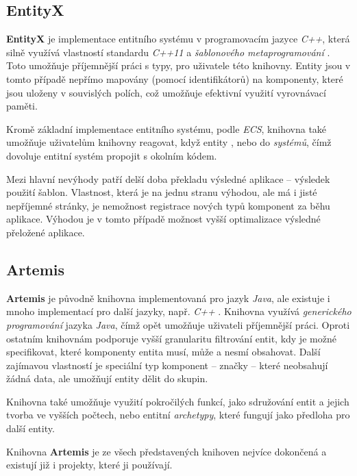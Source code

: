\subsection{EntityX}

\textbf{EntityX} \cite{EntityX} je implementace entitního systému v programovacím jazyce \emph{C++}, která silně využívá vlastností standardu \emph{C++11} a \emph{šablonového metaprogramování} \cite{CppMetaprogramming}. Toto umožňuje příjemnější práci s typy, pro uživatele této knihovny. Entity jsou v tomto případě nepřímo mapovány (pomocí identifikátorů) na komponenty, které jsou uloženy v souvislých polích, což umožňuje efektivní využití vyrovnávací paměti. 

Kromě základní implementace entitního systému, podle \emph{ECS}, knihovna také umožňuje uživatelům knihovny reagovat, když entity , nebo  do \emph{systémů}, čímž dovoluje entitní systém propojit s okolním kódem.

Mezi hlavní nevýhody patří delší doba překladu výsledné aplikace -- výsledek použití šablon. Vlastnost, která je na jednu stranu výhodou, ale má i jisté nepříjemné stránky, je nemožnost registrace nových typů komponent za běhu aplikace. Výhodou je v tomto případě možnost vyšší optimalizace výsledné přeložené aplikace.

\subsection{Artemis}

\textbf{Artemis} \cite{ArtemisJava} je původně knihovna implementovaná pro jazyk \emph{Java}, ale existuje i mnoho implementací pro další jazyky, např. \emph{C++} \cite{ArtemisCpp}. Knihovna využívá \emph{generického programování} jazyka \emph{Java}, čímž opět umožňuje uživateli příjemnější práci. Oproti ostatním knihovnám podporuje vyšší granularitu filtrování entit, kdy je možné specifikovat, které komponenty entita musí, může a nesmí obsahovat. Další zajímavou vlastností je speciální typ komponent -- značky -- které neobsahují žádná data, ale umožňují entity dělit do skupin. 

Knihovna také umožňuje využití pokročilých funkcí, jako sdružování entit a jejich tvorba ve vyšších počtech, nebo entitní \emph{archetypy}, které fungují jako předloha pro další entity.

Knihovna \textbf{Artemis} je ze všech představených knihoven nejvíce dokončená a existují již i projekty, které ji používají.

